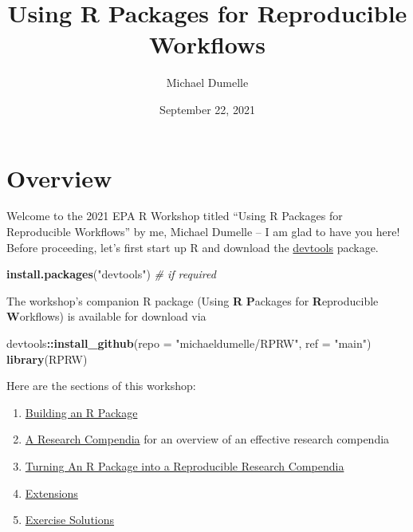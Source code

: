 \documentclass[
]{book}
\title{Using R Packages for Reproducible Workflows}
\author{Michael Dumelle}
\date{September 22, 2021}
\newenvironment{Shaded}{\begin{snugshade}}{\end{snugshade}}
\newcommand{\CommentTok}[1]{\textcolor[rgb]{0.56,0.35,0.01}{\textit{#1}}}
\newcommand{\DataTypeTok}[1]{\textcolor[rgb]{0.13,0.29,0.53}{#1}}
\newcommand{\KeywordTok}[1]{\textcolor[rgb]{0.13,0.29,0.53}{\textbf{#1}}}
\newcommand{\NormalTok}[1]{#1}
\newcommand{\OperatorTok}[1]{\textcolor[rgb]{0.81,0.36,0.00}{\textbf{#1}}}
\newcommand{\StringTok}[1]{\textcolor[rgb]{0.31,0.60,0.02}{#1}}
\begin{document}
\maketitle

{
\setcounter{tocdepth}{1}
\tableofcontents
}
\hypertarget{overview}{%
\chapter*{Overview}\label{overview}}

Welcome to the 2021 EPA R Workshop titled ``Using R Packages for Reproducible Workflows'' by me, Michael Dumelle -- I am glad to have you here! Before proceeding, let's first start up R and download the \href{https://devtools.r-lib.org/}{devtools} package.

\begin{Shaded}
\begin{Highlighting}[]
\KeywordTok{install.packages}\NormalTok{(}\StringTok{"devtools"}\NormalTok{) }\CommentTok{# if required}
\end{Highlighting}
\end{Shaded}

The workshop's companion R package (Using \textbf{R} \textbf{P}ackages for \textbf{R}eproducible \textbf{W}orkflows) is available for download via

\begin{Shaded}
\begin{Highlighting}[]
\NormalTok{devtools}\OperatorTok{::}\KeywordTok{install_github}\NormalTok{(}\DataTypeTok{repo =} \StringTok{"michaeldumelle/RPRW"}\NormalTok{, }\DataTypeTok{ref =} \StringTok{"main"}\NormalTok{)}
\KeywordTok{library}\NormalTok{(RPRW)}
\end{Highlighting}
\end{Shaded}

Here are the sections of this workshop:

\begin{enumerate}
\def\labelenumi{\arabic{enumi}.}
\item
  \protect\hyperlink{r-package}{Building an R Package}
\item
  \protect\hyperlink{a-research-compendia}{A Research Compendia} for an overview of an effective research compendia
\item
  \protect\hyperlink{your-compendia}{Turning An R Package into a Reproducible Research Compendia}
\item
  \protect\hyperlink{extensions}{Extensions}
\item
  \protect\hyperlink{exercise-solutions}{Exercise Solutions}
\end{enumerate}
\end{document}

